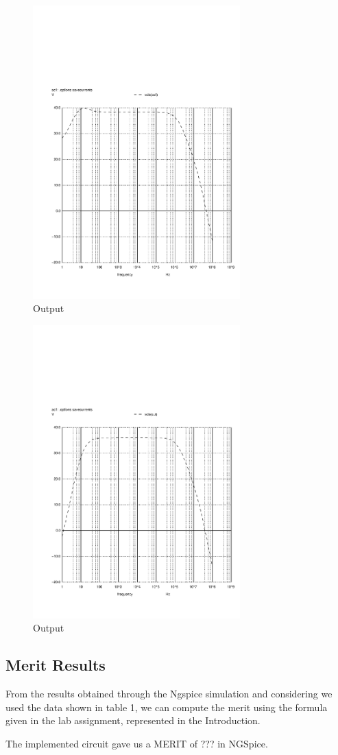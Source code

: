 \begin{figure}[H] 
\centering
\includegraphics[width = 8cm]{vo1f.pdf} 
\caption{Output}
\label{vo1f}
\end{figure}

\begin{figure}[H] 
\centering
\includegraphics[width = 8cm]{vo2f.pdf} 
\caption{Output}
\label{vo2f}
\end{figure}

\subsection{Merit Results}

From the results obtained through the Ngspice simulation and considering we used the data shown in table 1, we can compute the merit using the formula given in the lab assignment, represented in the Introduction.

The implemented circuit gave us a MERIT of ??? in NGSpice.



